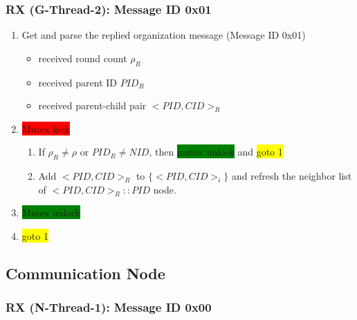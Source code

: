 \documentclass[letterpaper,10pt]{article}
\begin{document}
\subsubsection{RX (G-Thread-2): Message ID 0x01}

\begin{enumerate}
	\item Get and parse the replied organization message (Message ID 0x01)
	\begin{itemize}
		\item received round count $\rho_R$
		\item received parent ID $PID_R$
		\item received parent-child pair $<PID,CID>_R$	
	\end{itemize}
	\item \colorbox{red}{Mutex lock}
	\begin{enumerate}
		\item If $\rho_R \neq \rho$ or $PID_R \neq NID$, then \colorbox{green}{mutex unlock} and \colorbox{yellow}{goto 1}
		\item Add $<PID,CID>_R$ to $\{<PID,CID>_i\}$ and refresh the neighbor list of $<PID,CID>_R::PID$ node.
	\end{enumerate}
	\item \colorbox{green}{Mutex unlock}
	\item \colorbox{yellow}{goto 1}	
\end{enumerate}

\subsection{Communication Node}

\subsubsection{RX (N-Thread-1): Message ID 0x00}
\end{document}
